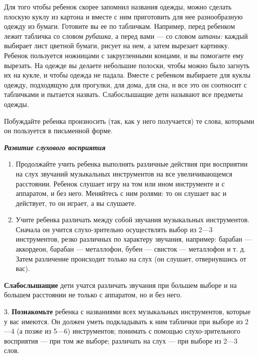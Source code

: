 \documentclass[a5paper]{book}
\renewcommand{\emph}[1]{\textit{#1}}
\begin{document}
Для того чтобы ребенок скорее запомнил названия одежды, можно сделать
плоскую куклу из картона и вместе с ним приготовить для нее
разнообразную одежду из бумаги. Готовите вы ее по табличкам. Например,
перед ребенком лежит табличка со словом \emph{рубашка,} а перед вами ---
со словом \emph{штаны:} каждый выбирает лист цветной бумаги, рисует на
нем, а затем вырезает картинку. Ребенок пользуется ножницами с
закругленными концами, и вы помогаете ему вырезать. На одежде вы делаете
небольшие полоски, чтобы можно было загнуть их на кукле, и чтобы одежда
не падала. Вместе с ребенком выбираете для куклы одежду, подходящую для
прогулки, для дома, для сна, и все это он соотносит с табличками и
пытается назвать. Слабослышащие дети называют все предметы одежды.

Побуждайте ребенка произносить (так, как у него получается) те слова,
которыми он пользуется в письменной форме.

\emph{\textbf{Развитие слухового восприятия}}


\begin{enumerate}
\def\labelenumi{\arabic{enumi}.}
\item
  
  Продолжайте учить ребенка выполнять различные действия при восприятии
  на слух звучаний музыкальных инструментов на все увеличивающемся
  расстоянии. Ребенок слушает игру на том или ином инструменте и с
  аппаратом, и без него. Меняйтесь с ним ролями: то он слушает вас и
  действует, то он играет, а вы слушаете.
  
\item
  
  Учите ребенка различать между собой звучания музыкальных инструментов.
  Сначала он учится слухо-зрительно осуществлять выбор из 2---3
  инструментов, резко различных по характеру звучания, например: барабан
  --- аккордеон, барабан --- металлофон, бубен --- свисток ---
  металлофон и т. д. Затем различение происходит только на слух (он
  слушает, отвернувшись от вас).
  
\end{enumerate}


\textbf{Слабослышащие} дети учатся различать звучания при большем выборе
и на большем расстоянии не только с аппаратом, но и без него.

3. \textbf{Познакомьте} ребенка с названиями всех музыкальных
инструментов, которые у вас имеются. Он должен уметь подкладывать к ним
таблички при выборе из 2---4 (а позже из 5---6) инструментов; понимать с
помощью слухо-зрительного восприятия --- при том же выборе; различать на
слух --- при выборе из 2---3 слов.
\end{document}
